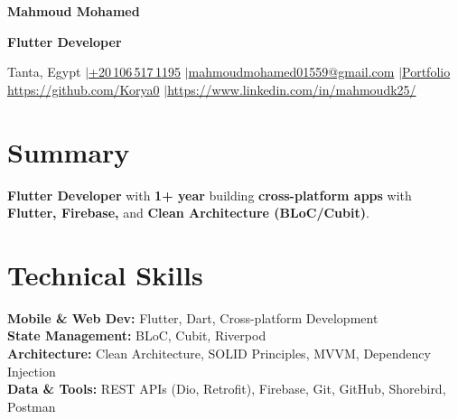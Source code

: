 \documentclass[a4paper,11pt]{article}
\begin{document}
\begin{center}
{\Huge\bfseries Mahmoud Mohamed}\par\vspace{3pt}
{\Large\bfseries Flutter Developer}\par\vspace{4pt}
{\normalsize Tanta, Egypt \enspace$|$\enspace \href{https://wa.me/201065171195}{+20\,106\,517\,1195} \enspace$|$\enspace \href{mailto:mahmoudmohamed01559@gmail.com}{mahmoudmohamed01559@gmail.com} \enspace$|$\enspace \href{https://aboard-drop-6d7.notion.site/Flutter-Developer-2427990c6fad808d8c72f2ebaabb3604}{Portfolio}\\[3pt]
\small\href{https://github.com/Korya0}{https://github.com/Korya0} \enspace$|$\enspace \href{https://www.linkedin.com/in/mahmoudk25/}{https://www.linkedin.com/in/mahmoudk25/}}
\end{center}
\section{Summary}
\textbf{Flutter Developer} with \textbf{1+ year} building \textbf{cross-platform apps} with \textbf{Flutter, Firebase,} and \textbf{Clean Architecture (BLoC/Cubit)}.
\section{Technical Skills}
\noindent
\textbf{Mobile \& Web Dev:} Flutter, Dart, Cross-platform Development \\ [3pt]
\textbf{State Management:} BLoC, Cubit, Riverpod \\ [3pt]
\textbf{Architecture:} Clean Architecture, SOLID Principles, MVVM, Dependency Injection \\ [3pt]
\textbf{Data \& Tools:} REST APIs (Dio, Retrofit), Firebase, Git, GitHub, Shorebird, Postman
\end{document}
